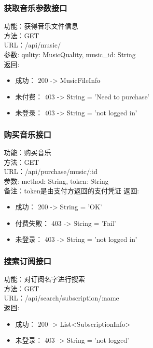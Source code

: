 \subsubsection{获取音乐参数接口}

\noindent
功能：获得音乐文件信息\\
方法：GET\\
URL：/api/music/\\
参数: qulity: MusicQuality, music\_id: String\\
返回:
\begin{itemize}
	\item 成功： 200 -> MusicFileInfo
	\item 未付费： 403 -> String = 'Need to purchase'
	\item 未登录： 403 -> String = 'not logged in'
\end{itemize}

\subsubsection{购买音乐接口}

\noindent
功能：购买音乐\\
方法：GET\\
URL：/api/purchase/music/:id\\
参数: method: String, token: String\\
备注：token是由支付方返回的支付凭证
返回:
\begin{itemize}
	\item 成功： 200 -> String = 'OK'
	\item 付费失败： 403 -> String = 'Fail'
	\item 未登录： 403 -> String = 'not logged in'
\end{itemize}


\subsubsection{搜索订阅接口}

\noindent
功能：对订阅名字进行搜索\\
方法：GET\\
URL：/api/search/subscription/:name\\
返回:
\begin{itemize}
	\item 成功： 200 -> List<SubscriptionInfo>
	\item 未登录： 403 -> String = 'not logged'
\end{itemize}

